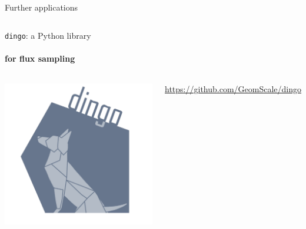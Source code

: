 \documentclass{beamer}
\begin{document}
\begin{frame}{Further applications}
\begin{singlespace}
\begin{columns}[onlytextwidth]
         \end{columns}
      \end{singlespace}
   \end{frame}


   \begin{frame}{\texttt{dingo}: a Python library }
      \framesubtitle{for flux sampling}


      \begin{columns}[onlytextwidth]

            \includegraphics[scale=0.1]{../resources/dingo5_transparent.png}
         

            \href{https://github.com/GeomScale/dingo}{https://github.com/GeomScale/dingo}





\end{columns}
\end{frame}
\end{document}
